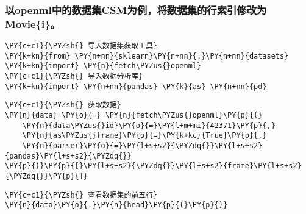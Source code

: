     \hypertarget{ux4ee5openmlux4e2dux7684ux6570ux636eux96c6csmux4e3aux4f8bux5c06ux6570ux636eux96c6ux7684ux884cux7d22ux5f15ux4feeux6539ux4e3amoviei}{%
\subsubsection{以openml中的数据集CSM为例，将数据集的行索引修改为Movie\{i\}。}\label{ux4ee5openmlux4e2dux7684ux6570ux636eux96c6csmux4e3aux4f8bux5c06ux6570ux636eux96c6ux7684ux884cux7d22ux5f15ux4feeux6539ux4e3amoviei}}

    \begin{tcolorbox}[breakable, size=fbox, boxrule=1pt, pad at break*=1mm,colback=cellbackground, colframe=cellborder]
\begin{Verbatim}[commandchars=\\\{\}]
\PY{c+c1}{\PYZsh{} 导入数据集获取工具}
\PY{k+kn}{from} \PY{n+nn}{sklearn}\PY{n+nn}{.}\PY{n+nn}{datasets} \PY{k+kn}{import} \PY{n}{fetch\PYZus{}openml}
\PY{c+c1}{\PYZsh{} 导入数据分析库}
\PY{k+kn}{import} \PY{n+nn}{pandas} \PY{k}{as} \PY{n+nn}{pd}
\end{Verbatim}
\end{tcolorbox}

    \begin{tcolorbox}[breakable, size=fbox, boxrule=1pt, pad at break*=1mm,colback=cellbackground, colframe=cellborder]
\begin{Verbatim}[commandchars=\\\{\}]
\PY{c+c1}{\PYZsh{} 获取数据}
\PY{n}{data} \PY{o}{=} \PY{n}{fetch\PYZus{}openml}\PY{p}{(}
    \PY{n}{data\PYZus{}id}\PY{o}{=}\PY{l+m+mi}{42371}\PY{p}{,}
    \PY{n}{as\PYZus{}frame}\PY{o}{=}\PY{k+kc}{True}\PY{p}{,}
    \PY{n}{parser}\PY{o}{=}\PY{l+s+s2}{\PYZdq{}}\PY{l+s+s2}{pandas}\PY{l+s+s2}{\PYZdq{}}
\PY{p}{)}\PY{p}{[}\PY{l+s+s2}{\PYZdq{}}\PY{l+s+s2}{frame}\PY{l+s+s2}{\PYZdq{}}\PY{p}{]}
\end{Verbatim}
\end{tcolorbox}

    \begin{tcolorbox}[breakable, size=fbox, boxrule=1pt, pad at break*=1mm,colback=cellbackground, colframe=cellborder]
\begin{Verbatim}[commandchars=\\\{\}]
\PY{c+c1}{\PYZsh{} 查看数据集的前五行}
\PY{n}{data}\PY{o}{.}\PY{n}{head}\PY{p}{(}\PY{p}{)}
\end{Verbatim}
\end{tcolorbox}


